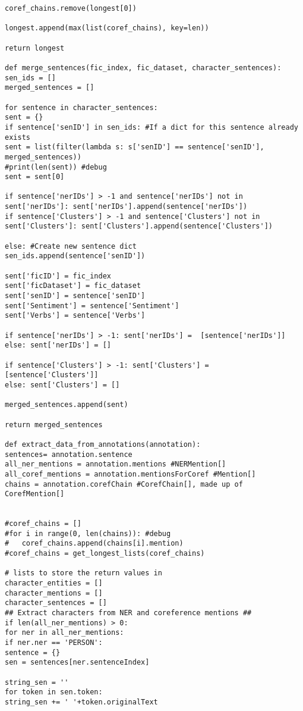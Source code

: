\documentclass{pre-tfg}
\begin{document}
\begin{lstlisting}[style=consola]
coref_chains.remove(longest[0])

longest.append(max(list(coref_chains), key=len))

return longest

def merge_sentences(fic_index, fic_dataset, character_sentences):
sen_ids = []
merged_sentences = []

for sentence in character_sentences:
sent = {}
if sentence['senID'] in sen_ids: #If a dict for this sentence already exists
sent = list(filter(lambda s: s['senID'] == sentence['senID'], merged_sentences))
#print(len(sent)) #debug
sent = sent[0]

if sentence['nerIDs'] > -1 and sentence['nerIDs'] not in sent['nerIDs']: sent['nerIDs'].append(sentence['nerIDs'])
if sentence['Clusters'] > -1 and sentence['Clusters'] not in sent['Clusters']: sent['Clusters'].append(sentence['Clusters'])

else: #Create new sentence dict
sen_ids.append(sentence['senID'])

sent['ficID'] = fic_index
sent['ficDataset'] = fic_dataset
sent['senID'] = sentence['senID']
sent['Sentiment'] = sentence['Sentiment']
sent['Verbs'] = sentence['Verbs']

if sentence['nerIDs'] > -1: sent['nerIDs'] =  [sentence['nerIDs']]
else: sent['nerIDs'] = []

if sentence['Clusters'] > -1: sent['Clusters'] = [sentence['Clusters']]
else: sent['Clusters'] = []

merged_sentences.append(sent)

return merged_sentences

def extract_data_from_annotations(annotation):
sentences= annotation.sentence
all_ner_mentions = annotation.mentions #NERMention[]
all_coref_mentions = annotation.mentionsForCoref #Mention[]
chains = annotation.corefChain #CorefChain[], made up of CorefMention[]


#coref_chains = []
#for i in range(0, len(chains)): #debug
#	coref_chains.append(chains[i].mention)
#coref_chains = get_longest_lists(coref_chains)

# lists to store the return values in
character_entities = []
character_mentions = []
character_sentences = []
## Extract characters from NER and coreference mentions ##
if len(all_ner_mentions) > 0:
for ner in all_ner_mentions:
if ner.ner == 'PERSON':
sentence = {}
sen = sentences[ner.sentenceIndex]

string_sen = ''
for token in sen.token: 
string_sen += ' '+token.originalText


\end{lstlisting}
\end{document}

